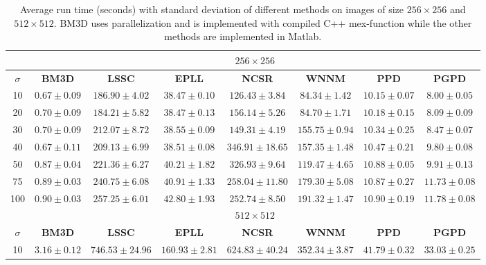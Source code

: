 \begin{table}[t!]
\vspace{-4mm}
\begin{adjustwidth}{-0.2cm}{}
\caption{Average run time (seconds) with standard deviation of different methods on images of size $256\times 256$ and $512\times 512$. BM3D uses parallelization and is implemented with compiled C++ mex-function while the other methods are implemented in Matlab.}
\label{tab2-5}
\scriptsize
\begin{center}
\begin{tabular}{|c||c|c|c|c|c|c|c|}
\hline
&\multicolumn{7}{c|}{ $256 \times 256$}
\\
\hline
\hline
$\sigma$ &\textbf{BM3D}&\textbf{LSSC}&\textbf{EPLL}&\textbf{NCSR}&\textbf{WNNM}&\textbf{PPD}&\textbf{PGPD} 
\\
\hline
10  & $0.67\pm 0.09$  & $186.90\pm4.02$  & $38.47\pm0.10 $   & $126.43\pm3.84$   & $84.34\pm1.42$ &$10.15\pm0.07$ & $8.00\pm0.05$  
\\
\hline
20  &  $0.70\pm0.09$  & $184.21\pm5.82$   & $38.47\pm0.13$   &  $156.14\pm5.26$  &  $84.70\pm1.71$&$10.18\pm0.15$  &  $8.09\pm 0.09$             
\\
\hline 
30    &  $0.70 \pm 0.09$  &  $212.07\pm8.72$  & $38.55\pm0.09$  &  $149.31\pm4.19$  &  $155.75\pm0.94$ &$10.34\pm0.25$ &  $8.47\pm0.07$            
\\
\hline
40   &  $0.67\pm0.11$  &$209.13\pm6.99$ &  $38.51\pm0.08$  &  $346.91\pm18.65$  &  $157.35\pm1.48$&$10.47\pm0.21$  & $9.80\pm0.08$            
\\
\hline
50  &  $0.87\pm0.04$  &  $221.36\pm6.27$  &  $40.21\pm1.82 $  &  $326.93\pm9.64$  & $119.47\pm4.65$&$10.88\pm0.05$    &  $9.91\pm0.13$     
\\
\hline
75    & $0.89\pm0.03$ &  $240.75\pm6.08$  &   $40.91\pm1.33$ &  $258.04\pm11.80$  & $ 179.30\pm5.08$ &$10.87\pm0.27$  &   $11.73\pm0.08$  
\\
\hline
100  &  $0.90\pm0.03$  &  $257.25\pm6.01 $  &$42.80\pm 1.93$  & $252.74\pm8.50$   &  $191.32\pm 1.47$  &$10.90\pm0.19$ &  $11.78\pm0.08$     
\\
\hline
\hline
&\multicolumn{7}{c|}{ $512 \times 512$}
\\
\hline
\hline
$\sigma$ &\textbf{BM3D}&\textbf{LSSC}&\textbf{EPLL}&\textbf{NCSR}&\textbf{WNNM}&\textbf{PPD}&\textbf{PGPD} 
\\
\hline
10  &$3.16\pm0.12$ & $746.53\pm24.96$  &  $160.93\pm2.81$  & $624.83\pm40.24$   &  $352.34\pm3.87$&$41.79\pm0.32$  &  $33.03\pm0.25$   

\end{tabular}
\end{center}
\end{adjustwidth}
\end{table}
